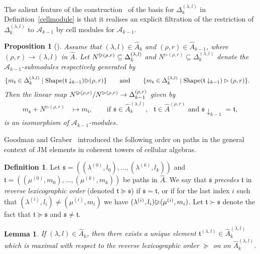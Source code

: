 \documentclass[11pt,a4paper,reqno,svgnames]{amsart}
\theoremstyle{plain}
\newtheorem{proposition}[theorem]{Proposition}
\newtheorem{lemma}[theorem]{Lemma}
\theoremstyle{definition}
\newtheorem{definition}[theorem]{Definition}
\numberwithin{equation}{section}
\begin{document}
The salient feature of the construction~\cite{EG:2012} of the basis for $\Delta^{(\lambda,l)}_k$ in Definition~\ref{cellmodule} is that it realises an explicit  filtration of the restriction of  $\Delta^{(\lambda,l)}_k$ to $\mathcal{A}_{k-1}$  by cell modules for $\mathcal{A}_{k-1}$. 
\begin{proposition}[{\cite[Lemma~3.13]{EG:2012}}]\label{filtration}
Assume that $(\lambda,l)\in\hat{A}_k$ and $(\rho,r)\in\hat{A}_{k-1}$, where $(\rho,r)\to(\lambda,l)$ in $\hat{A}$. Let $N^{{\trianglerighteqslant}(\rho,r)}\subseteq \Delta_{k}^{(\lambda,l)}$ and $N^{\rhd(\rho,r)}\subseteq \Delta_{k}^{(\lambda,l)}$ denote the $\mathcal{A}_{k-1}$-submodules respectively generated by 
\begin{align*}
&\lbrace m_\mathfrak{t}\in \Delta_{k}^{(\lambda,l)}\mid \operatorname{Shape}(\mathfrak{t}\downarrow_{k-1}){\trianglerighteqslant}(\rho,r)\rbrace
\qquad\text{and}\qquad
\lbrace m_\mathfrak{t}\in \Delta_{k}^{(\lambda,l)}\mid \operatorname{Shape}(\mathfrak{t}\downarrow_{k-1})\rhd(\rho,r)\rbrace.
\end{align*}
Then the linear map $N^{{\trianglerighteqslant}(\rho,r)}/N^{\rhd(\rho,r)} \to \Delta^{(\rho,r)}_{k-1}$ given by 
\begin{align*}
m_\mathfrak{s}+N^{\rhd(\rho,r)}&\mapsto m_\mathfrak{t}, \qquad\text{if $\mathfrak{s}\in\hat{A}_k^{(\lambda,l)},$ $\mathfrak{t}\in\hat{A}^{(\rho,r)}$ and  $\mathfrak{s}\downarrow_{k-1}=\mathfrak{t},$}
\end{align*}
is an isomorphism of $\mathcal{A}_{k-1}$-modules.
\end{proposition}
Goodman and Graber~\cite[Definition~2.16]{MR2774622} introduced the following order on paths in the general context of JM elements in coherent towers of cellular algebras. 
\begin{definition}
Let $\mathfrak{s}=((\lambda^{(0)},l_0),\ldots,(\lambda^{(k)},l_k))$ and $\mathfrak{t}=((\mu^{(0)},m_0),\ldots,(\mu^{(k)},m_k))$ be paths in $\hat{A}$. We say that $\mathfrak{s}$ \emph{precedes} $\mathfrak{t}$ in \emph{reverse lexicographic order} (denoted $\mathfrak{t}\succcurlyeq\mathfrak{s}$) if $\mathfrak{s}=\mathfrak{t}$, or if for the last index $i$ such that $(\lambda^{(i)},l_i)\ne (\mu^{(i)},m_i)$ we have $(\lambda^{(i)},l_i){\trianglerighteqslant} (\mu^{(i)},m_i)$. Let $\mathfrak{t}\succ\mathfrak{s}$ denote the fact that $\mathfrak{t}\succcurlyeq\mathfrak{s}$ and $\mathfrak{s}\ne \mathfrak{t}$. 
\end{definition}
\begin{lemma}
If $(\lambda,l)\in\hat{A}_k$, then there exists a unique element $\mathfrak{t}^{(\lambda,l)}\in \hat{A}_k^{(\lambda,l)}$ which is maximal with respect to the reverse lexicographic order $\succcurlyeq$ on on $\hat{A}_k^{(\lambda,l)}$. 
\end{lemma}
\end{document}
